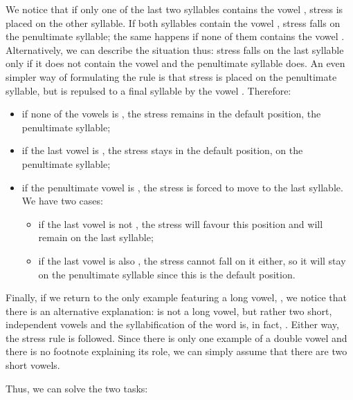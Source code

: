 \begin{refsection}
\begin{mysolution}
We notice that if only one of the last two syllables contains the vowel , stress is placed on the other syllable. If both syllables contain the vowel , stress falls on the penultimate syllable; the same happens if none of them contains the vowel . Alternatively, we can describe the situation thus: stress falls on the last syllable only if it does not contain the vowel  and the penultimate syllable does. An even simpler way of formulating the rule is that stress is placed on the penultimate syllable, but is repulsed to a final syllable by the vowel . Therefore:

\begin{itemize}
    \item if none of the vowels is , the stress remains in the default position, the penultimate syllable;
    \item if the last vowel is , the stress stays in the default position, on the penultimate syllable;
    \item if the penultimate vowel is , the stress is forced to move to the last syllable. We have two cases:
    \begin{itemize}
        \item if the last vowel is not , the stress will favour this position and will remain on the last syllable;
        \item if the last vowel is also , the stress cannot fall on it either, so it will stay on the penultimate syllable since this is the default position.
    \end{itemize}
\end{itemize}

Finally, if we return to the only example featuring a long vowel, , we notice that there is an alternative explanation:  is not a long vowel, but rather two short, independent vowels and the syllabification of the word is, in fact, . Either way, the stress rule is followed. Since there is only one example of a double vowel and there is no footnote explaining its role, we can simply assume that there are two short vowels.

Thus, we can solve the two tasks:

\begin{solutions}
    \item \begin{itemize}[leftmargin = 1em]


\end{itemize}
\end{solutions}
\end{mysolution}
\end{refsection}
